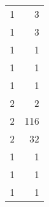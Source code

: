 \begin{tabular}{rr}
                  1 &             3 \\
                  1 &             3 \\
                  1 &             1 \\
                  1 &             1 \\
                  1 &             1 \\
                  2 &             2 \\
                  2 &           116 \\
                  2 &            32 \\
                  1 &             1 \\
                  1 &             1 \\
                  1 &             1 \\
\bottomrule
\end{tabular}
